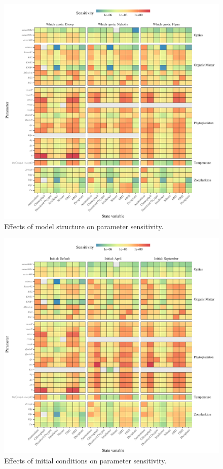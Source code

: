 \documentclass[letterpaper,12pt,oneside]{article}\usepackage[]{graphicx}\usepackage[]{color}
\begin{document}
\begin{figure}[!ht]

{\centering \includegraphics[width=\textwidth]{figs/streval-1} 

}

\caption[Effects of model structure on parameter sensitivity]{Effects of model structure on parameter sensitivity.}\label{fig:streval}
\end{figure}



\begin{figure}[!ht]

{\centering \includegraphics[width=\textwidth]{figs/inieval-1} 

}

\caption[Effects of initial conditions on parameter sensitivity]{Effects of initial conditions on parameter sensitivity.}\label{fig:inieval}
\end{figure}
\end{document}

